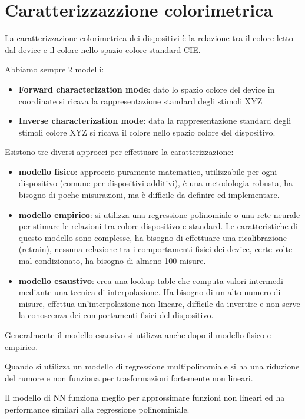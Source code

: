 \section{Caratterizzazzione colorimetrica}
La caratterizzazione colorimetrica dei dispositivi è la relazione tra il colore 
letto dal device e il colore nello spazio colore standard CIE.

Abbiamo sempre 2 modelli:
\begin{itemize}
    \item \textbf{Forward characterization mode}: dato lo spazio colore del device 
    in coordinate si ricava la rappresentazione standard degli stimoli XYZ
    \item \textbf{Inverse characterization mode}: data la rappresentazione standard 
    degli stimoli colore XYZ si ricava il colore nello spazio colore del dispositivo.
\end{itemize}

Esistono tre diversi approcci per effettuare la caratterizzazione:
\begin{itemize}
    \item \textbf{modello fisico}: approccio puramente matematico, utilizzabile 
    per ogni dispositivo (comune per dispositivi additivi), è una metodologia robusta,
    ha bisogno di poche misurazioni, ma è difficile da definire ed implementare.
    \item \textbf{modello empirico}: si utilizza una regressione polinomiale o una 
    rete neurale per stimare le relazioni tra colore dispositivo e standard. Le 
    caratteristiche di questo modello sono complesse, ha bisogno di effettuare 
    una ricalibrazione (retrain), nessuna relazione tra i comportamenti fisici dei 
    device, certe volte mal condizionato, ha bisogno di almeno 100 misure.
    \item \textbf{modello esaustivo}: crea una lookup table che computa valori intermedi 
    mediante una tecnica di interpolazione. Ha bisogno di un alto numero di misure, 
    effettua un'interpolazione non lineare, difficile da invertire e non serve la 
    conoscenza dei comportamenti fisici del dispositivo.
\end{itemize}

Generalmente il modello esausivo si utilizza anche dopo il modello fisico e empirico.
\begin{nota}
    Quando si utilizza un modello di regressione multipolinomiale si ha una riduzione 
    del rumore e non funziona per trasformazioni fortemente non lineari.
\end{nota}
\begin{nota}
    Il modello di NN funziona meglio per approssimare funzioni non lineari ed ha 
    performance similari alla regressione polinominiale.
\end{nota}
